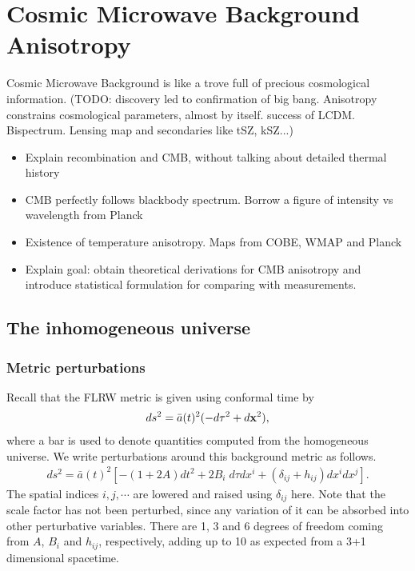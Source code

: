 
\chapter{Cosmic Microwave Background Anisotropy}

\ifpdf
    \graphicspath{{Chapter2/Figs/Raster/}{Chapter2/Figs/PDF/}{Chapter2/Figs/}}
\else
    \graphicspath{{Chapter2/Figs/Vector/}{Chapter2/Figs/}}
\fi

Cosmic Microwave Background is like a trove full of precious cosmological information.
(TODO: discovery led to confirmation of big bang. Anisotropy constrains cosmological parameters, almost by itself. success of LCDM. Bispectrum. Lensing map and secondaries like tSZ, kSZ...)



\begin{itemize}
	\item Explain recombination and CMB, without talking about detailed thermal history 
	\item CMB perfectly follows blackbody spectrum. Borrow a figure of intensity vs wavelength from Planck
	\item Existence of temperature anisotropy. Maps from COBE, WMAP and Planck
	\item Explain goal: obtain theoretical derivations for CMB anisotropy and introduce statistical formulation for comparing with measurements.	
\end{itemize}

\section{The inhomogeneous universe}

\subsection{Metric perturbations} \label{section:metric_perturbations}
Recall that the FLRW metric is given using conformal time by
\begin{align}
	ds^2 = \bar{a}(t)^2 (-d\tau^2 + d\mathbf{x}^2),
\end{align}
where a bar is used to denote quantities computed from the homogeneous universe. We write perturbations around this background metric as follows.
\begin{align}
	ds^2 = \bar{a}(t)^2 \left[ -(1+2A) dt^2 + 2B_i \; d\tau dx^i + (\delta_{ij} + h_{ij}) dx^i dx^j \right].
\end{align}
The spatial indices $i,j,\cdots$ are lowered and raised using $\delta_{ij}$ here. Note that the scale factor has not been perturbed, since any variation of it can be absorbed into other perturbative variables. There are 1, 3 and 6 degrees of freedom coming from $A$, $B_i$ and $h_{ij}$, respectively, adding up to 10 as expected from a 3+1 dimensional spacetime.

